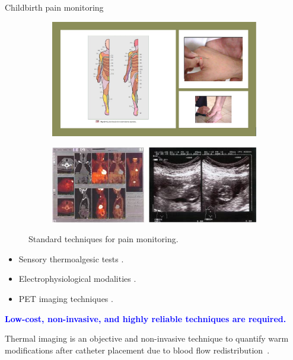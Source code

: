 \documentclass[aspectratio=169]{beamer}
\let\oldcite\cite %
\renewcommand{\cite}[1]{{\tiny\oldcite{#1}}}
\begin{document}
\begin{frame}[allowframebreaks]{Childbirth pain monitoring}
\begin{figure}
    \begin{subfigure}
        \centering
        \includegraphics[height = 0.2\textwidth]{Figures/termoalgesia.jpg}
        \label{fig:termoalgesia}
    \end{subfigure}
    \begin{subfigure}
        \centering
        \includegraphics[height = 0.2\textwidth]{Figures/pet2.jpeg}
        \label{fig:pet2}
    \end{subfigure}
    \label{fig:pet}
    \caption{Standard techniques for pain monitoring.}
\end{figure}
\vspace{-0.5cm}
\begin{itemize}
    \item Sensory thermoalgesic tests {\cite{https://doi.org/10.1111/anae.12927}}.
    \item Electrophysiological modalities {\cite{CHAE2022104744}}.
    \item PET imaging techniques {\cite{nelson2018survey}}.
\end{itemize}

\begin{center}
\small{\textcolor{blue}{\textbf{Low-cost, non-invasive, and highly reliable techniques are required.} }}
\end{center}

\framebreak

Thermal imaging is an objective and non-invasive technique to quantify warm modifications after catheter placement due to blood flow redistribution~{\tiny{\cite{2143r23}}}. 

\begin{columns}


\end{columns}
\end{frame}
\end{document}
